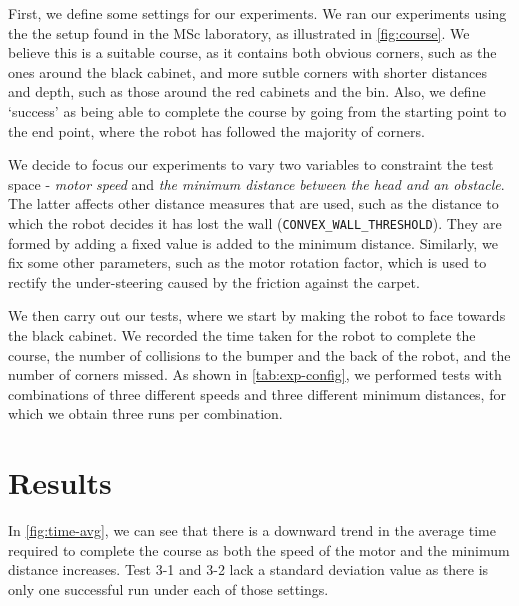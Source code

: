 \documentclass[a4paper,12pt]{article}
\begin{document}
First, we define some settings for our experiments. We ran our experiments using the the setup found in the MSc laboratory, as illustrated in \autoref{fig:course}. We believe this is a suitable course, as it contains both obvious corners, such as the ones around the black cabinet, and more sutble corners with shorter distances and depth, such as those around the red cabinets and the bin. Also, we define `success' as being able to complete the course by going from the starting point to the end point, where the robot has followed the majority of corners.

We decide to focus our experiments to vary two variables to constraint the test space - \textit{motor speed} and \textit{the minimum distance between the head and an obstacle}. The latter affects other distance measures that are used, such as the distance to which the robot decides it has lost the wall (\texttt{CONVEX\_WALL\_THRESHOLD}). They are formed by adding a fixed value is added to the minimum distance. Similarly, we fix some other parameters, such as the motor rotation factor, which is used to rectify the under-steering caused by the friction against the carpet.

We then carry out our tests, where we start by making the robot to face towards the black cabinet. We recorded the time taken for the robot to complete the course, the number of collisions to the bumper and the back of the robot, and the number of corners missed. As shown in \autoref{tab:exp-config}, we performed tests with combinations of three different speeds and three different minimum distances, for which we obtain three runs per combination. 



\section{Results}
In \autoref{fig:time-avg}, we can see that there is a downward trend in the average time required to complete the course as both the speed of the motor and the minimum distance increases. Test 3-1 and 3-2 lack a standard deviation value as there is only one successful run under each of those settings.
\end{document}

